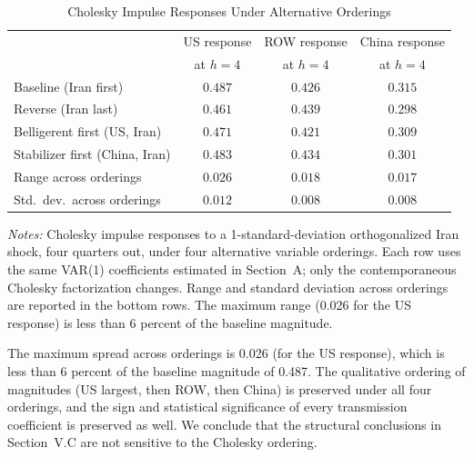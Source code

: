 \documentclass[12pt]{article}
\begin{document}
\begin{table}[htbp]
\centering
\caption{Cholesky Impulse Responses Under Alternative Orderings}
\label{tab:ordering}
\begin{threeparttable}
\begin{tabular}{lccc}
\toprule
& US response & ROW response & China response \\
& at $h=4$ & at $h=4$ & at $h=4$ \\
\midrule
Baseline (Iran first) & $0.487$ & $0.426$ & $0.315$ \\
Reverse (Iran last) & $0.461$ & $0.439$ & $0.298$ \\
Belligerent first (US, Iran) & $0.471$ & $0.421$ & $0.309$ \\
Stabilizer first (China, Iran) & $0.483$ & $0.434$ & $0.301$ \\
\midrule
Range across orderings & $0.026$ & $0.018$ & $0.017$ \\
Std.\ dev.\ across orderings & $0.012$ & $0.008$ & $0.008$ \\
\bottomrule
\end{tabular}
\begin{tablenotes}
\small
\item \textit{Notes:} Cholesky impulse responses to a 1-standard-deviation orthogonalized Iran shock, four quarters out, under four alternative variable orderings. Each row uses the same VAR(1) coefficients estimated in Section~A; only the contemporaneous Cholesky factorization changes. Range and standard deviation across orderings are reported in the bottom rows. The maximum range (0.026 for the US response) is less than 6 percent of the baseline magnitude.
\end{tablenotes}
\end{threeparttable}
\end{table}

The maximum spread across orderings is 0.026 (for the US response), which is less than 6 percent of the baseline magnitude of 0.487. The qualitative ordering of magnitudes (US largest, then ROW, then China) is preserved under all four orderings, and the sign and statistical significance of every transmission coefficient is preserved as well. We conclude that the structural conclusions in Section~V.C are not sensitive to the Cholesky ordering.


\end{document}
